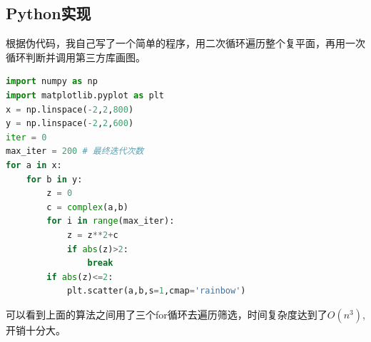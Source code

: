 \documentclass{ctexart}
\begin{document}
\subsection{Python实现}
根据伪代码，我自己写了一个简单的程序，用二次循环遍历整个复平面，再用一次循环判断并调用第三方库画图。
\begin{lstlisting}[language=Python]
import numpy as np
import matplotlib.pyplot as plt
x = np.linspace(-2,2,800)
y = np.linspace(-2,2,600)
iter = 0
max_iter = 200 # 最终迭代次数
for a in x:
    for b in y:
        z = 0
        c = complex(a,b)
        for i in range(max_iter):
            z = z**2+c
            if abs(z)>2:
                break 
        if abs(z)<=2:
            plt.scatter(a,b,s=1,cmap='rainbow')
\end{lstlisting}

可以看到上面的算法之间用了三个for循环去遍历筛选，时间复杂度达到了$O(n^3)$,开销十分大。
\end{document}
